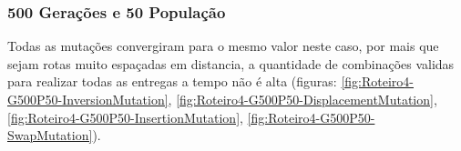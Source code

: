 \begin{center}
	\label{fig:Roteiro4-Mapa3}
\end{center}
\begin{center}
	\label{fig:Roteiro4-Mapa4}
\end{center}

\subsubsection{500 Gerações e 50 População}

Todas as mutações convergiram para o mesmo valor neste caso, por mais que sejam rotas muito espaçadas em distancia, a quantidade de combinações validas para realizar todas as entregas a tempo não é alta (figuras: \ref{fig:Roteiro4-G500P50-InversionMutation}, \ref{fig:Roteiro4-G500P50-DisplacementMutation}, \ref{fig:Roteiro4-G500P50-InsertionMutation}, \ref{fig:Roteiro4-G500P50-SwapMutation}).

